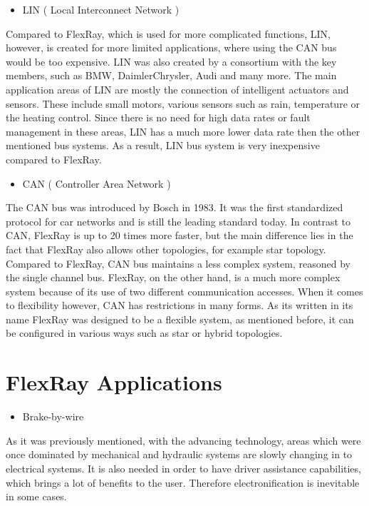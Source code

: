 \documentclass[conference]{IEEEtran}
\begin{document}
\begin{itemize}
  \item LIN ( Local Interconnect Network )
\end{itemize}
Compared to FlexRay, which is used for more complicated functions, LIN, however, is created for more limited applications, where using the CAN bus would be too expensive. LIN was also created by a consortium with the key members, such as BMW, DaimlerChrysler, Audi and many more. The main application areas of LIN are mostly the connection of intelligent actuators and sensors. These include small motors, various sensors such as rain, temperature or the heating control. Since there is no need for high data rates or fault management in these areas, LIN has a much more lower data rate then the other mentioned bus systems. As a result, LIN bus system is very inexpensive compared to FlexRay.\\

\begin{itemize}
  \item CAN ( Controller Area Network )
\end{itemize}

The CAN bus was introduced by Bosch in 1983. It was the first standardized protocol for car networks and is still the leading standard today. In contrast to CAN, FlexRay is up to 20 times more faster, but the main difference lies in the fact that FlexRay also allows other topologies, for example star topology. Compared to FlexRay, CAN bus maintains a less complex system, reasoned by the single channel bus. FlexRay, on the other hand, is a much more complex system because of its use of two different communication accesses. When it comes to flexibility however, CAN has restrictions in many forms. As its written in its name FlexRay was designed to be a flexible system, as mentioned before, it can be configured in various ways such as star or hybrid topologies.

\section{FlexRay Applications}

\begin{itemize}
  \item Brake-by-wire
\end{itemize}
As it was previously mentioned, with the advancing technology, areas which were once dominated by mechanical and hydraulic systems are slowly changing in to electrical systems. It is also needed in order to have driver assistance capabilities, which brings a lot of benefits to the user. Therefore electronification is inevitable in some cases.\\
\end{document}

